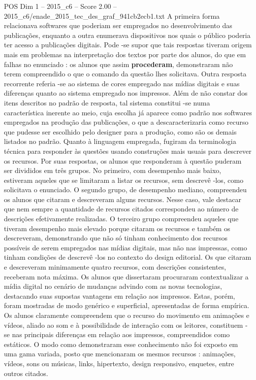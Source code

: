 \begin{textsample}{POS Dim 1 – 2015\_c6 – Score 2.00 – 2015\_c6/enade\_2015\_tec\_des\_graf\_941cb2ecb1.txt}
A primeira forma relacionava softwares que poderiam ser empregados no desenvolvimento das publicações, enquanto a outra enumerava dispositivos nos quais o público poderia ter acesso a publicações digitais.
Pode -se supor que tais respostas tiveram origem mais em problemas na interpretação dos textos por parte dos alunos, do que em falhas no enunciado : os alunos que assim \textbf{procederam}, demonstraram não terem compreendido o que o comando da questão lhes solicitava.
Outra resposta recorrente referia -se ao sistema de cores empregado nas mídias digitais e suas diferenças quanto ao sistema empregado nos impressos.
Além de não constar dos itens descritos no padrão de resposta, tal sistema constitui -se numa característica inerente ao meio, cuja escolha já aparece como padrão nos softwares empregados na produção das publicações, o que a descaracterizaria como recurso que pudesse ser escolhido pelo designer para a produção, como são os demais listados no padrão.
Quanto à linguagem empregada, fugiram da terminologia técnica para responder às questões usando construções mais usuais para descrever os recursos.
Por suas respostas, os alunos que responderam à questão puderam ser divididos em três grupos.
No primeiro, com desempenho mais baixo, estiveram aqueles que se limitaram a listar os recursos, sem descrevê -los, como solicitava o enunciado.
O segundo grupo, de desempenho mediano, compreendeu os alunos que citaram e descreveram alguns recursos.
Nesse caso, vale destacar que nem sempre a quantidade de recursos citados correspondeu ao número de descrições efetivamente realizadas.
O terceiro grupo compreendeu aqueles que tiveram desempenho mais elevado porque citaram os recursos e também os descreveram, demonstrando que não só tinham conhecimento dos recursos possíveis de serem empregados nas mídias digitais, mas não nas impressas, como tinham condições de descrevê -los no contexto do design editorial.
Os que citaram e descreveram minimamente quatro recursos, com descrições consistentes, receberam nota máxima.
Os alunos que dissertaram procuraram contextualizar a mídia digital no cenário de mudanças advindo com as novas tecnologias, destacando suas supostas vantagens em relação aos impressos.
Estas, porém, foram mostradas de modo genérico e superficial, apresentadas de forma empírica.
Os alunos claramente compreendem que o recurso do movimento em animações e vídeos, aliado ao som e à possibilidade de interação com os leitores, constituem -se nas principais diferenças em relação aos impressos, compreendidos como estáticos.
O modo como demonstraram esse conhecimento não foi exposto em uma gama variada, posto que mencionaram os mesmos recursos : animações, vídeos, sons ou músicas, links, hipertexto, design responsivo, enquetes, entre outros citados.

\end{textsample}

